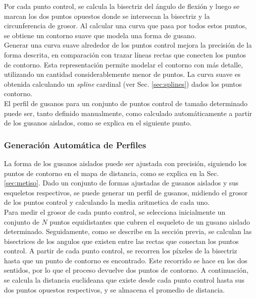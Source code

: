 Por cada punto control, se calcula la bisectriz del \'angulo de flexi\'on y luego
se marcan los dos puntos opuestos donde se intersecan la bisectriz y la circunferencia
de grosor. Al calcular una curva que pasa por todos estos puntos, se obtiene un
contorno suave que modela una forma de gusano.\\

Generar una curva suave alrededor de los puntos control mejora la precisi\'on
de la forma descrita, en comparaci\'on con trazar l\'ineas rectas que
conecten los puntos de contorno. Esta representaci\'on permite modelar el 
contorno con m\'as detalle, utilizando un cantidad considerablemente menor
de puntos. La curva suave es obtenida calculando un \emph{spline} cardinal
(ver Sec. \ref{sec:splines}) dados los puntos contorno.\\

El perfil de gusanos para un conjunto de puntos control de tama\~no determinado 
puede ser, tanto definido manualmente, como calculado autom\'aticamente a partir
de los gusanos aislados, como se explica en el siguiente punto.


\subsubsection{Generaci\'on Autom\'atica de Perfiles}
\label{sec:metwormprof}

La forma de los gusanos aislados puede ser ajustada con precisi\'on, siguiendo
los puntos de contorno en el mapa de distancia, como se explica en la Sec. \ref{sec:metiso}.
Dado un conjunto de formas ajustadas de gusanos aislados y sus esqueletos respectivos, se 
puede generar un perfil de gusanos, midiendo el grosor de los puntos control y calculando
la media aritmetica de cada uno.\\

Para medir el grosor de cada punto control, se selecciona inicialmente un conjunto
de $N$ puntos equidistantes que cubren el esqueleto de un gusano aislado determinado.
Seguidamente, como se describe en la secci\'on previa, se calculan las bisectrices de los angulos
que existen entre las rectas que conectan los puntos control. A partir de cada punto control, 
se recorren los p\'ixeles de la bisectriz hasta que un punto de contorno es encontrado. Este
recorrido se hace en los dos sentidos, por lo que el proceso devuelve dos puntos de contorno.
A continuaci\'on, se calcula la distancia euclideana que existe desde cada punto control hasta
sus dos puntos opuestos respectivos, y se almacena el promedio de distancia.\\

